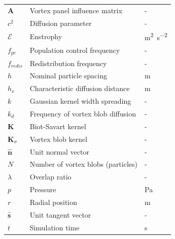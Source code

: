 {\renewcommand{\arraystretch}{1.2} %
\begin{longtable}{p{1.5cm}p{10.5cm}p{1.5cm}}
    $\mathbf{A}$			& Vortex panel influence matrix						& -\\         

	$c^2$ 					& Diffusion parameter 								& - \\

    $\mathcal{E}$			& Enstrophy			  								& \si{m^2.s^{-2}} \\

	$f_{pc}$				& Population control frequency & - \\
	$f_{redis}$				& Redistribution frequency & - \\
	
    $h$						& Nominal particle spacing							& \si{m}\\   
    $h_{\nu}$				& Characteristic diffusion distance					& \si{m}\\ 

	$k$ & Gaussian kernel width spreading	& -\\
	$k_d$ & Frequency of vortex blob diffusion  								& -\\
    $\mathbf{K}$			& Biot-Savart kernel 								& -\\ 
    $\mathbf{K}_{\sigma}$	& Vortex blob kernel 								& -\\     

	$\hat{\mathbf{n}}$  	& Unit normal vector 								& -\\
	$N$  					& Number of vortex blobs (particles) 				& -\\

	$\lambda$			& Overlap ratio 									& - \\    
	
	$p$						& Pressure											& \si{Pa}\\

	$r$ 					& Radial position 									& \si{m}\\
	
	$\hat{\mathbf{s}}$		& Unit tangent vector								& - \\
	
	$t$						& Simulation time									& \si{s} \\
	

\end{longtable}}
